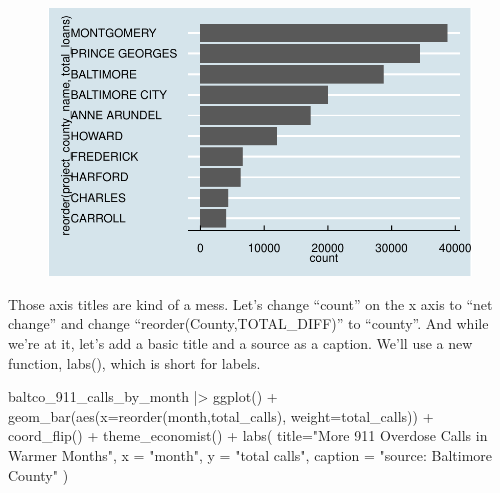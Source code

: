 \documentclass[
  letterpaper,
  DIV=11,
  numbers=noendperiod]{scrreprt}
\newenvironment{Shaded}{\begin{snugshade}}{\end{snugshade}}
\newcommand{\AttributeTok}[1]{\textcolor[rgb]{0.40,0.45,0.13}{#1}}
\newcommand{\FunctionTok}[1]{\textcolor[rgb]{0.28,0.35,0.67}{#1}}
\newcommand{\NormalTok}[1]{\textcolor[rgb]{0.00,0.23,0.31}{#1}}
\newcommand{\SpecialCharTok}[1]{\textcolor[rgb]{0.37,0.37,0.37}{#1}}
\newcommand{\StringTok}[1]{\textcolor[rgb]{0.13,0.47,0.30}{#1}}
\begin{document}
\begin{figure}[H]

{\centering \includegraphics{./visualizing-for-reporting_files/figure-pdf/unnamed-chunk-10-1.pdf}

}

\end{figure}

Those axis titles are kind of a mess. Let's change ``count'' on the x
axis to ``net change'' and change ``reorder(County,TOTAL\_DIFF)'' to
``county''. And while we're at it, let's add a basic title and a source
as a caption. We'll use a new function, labs(), which is short for
labels.

\begin{Shaded}
\begin{Highlighting}[]
\NormalTok{baltco\_911\_calls\_by\_month }\SpecialCharTok{|\textgreater{}}
  \FunctionTok{ggplot}\NormalTok{() }\SpecialCharTok{+}
  \FunctionTok{geom\_bar}\NormalTok{(}\FunctionTok{aes}\NormalTok{(}\AttributeTok{x=}\FunctionTok{reorder}\NormalTok{(month,total\_calls), }\AttributeTok{weight=}\NormalTok{total\_calls)) }\SpecialCharTok{+}
  \FunctionTok{coord\_flip}\NormalTok{() }\SpecialCharTok{+} 
  \FunctionTok{theme\_economist}\NormalTok{() }\SpecialCharTok{+}
  \FunctionTok{labs}\NormalTok{(}
    \AttributeTok{title=}\StringTok{"More 911 Overdose Calls in Warmer Months"}\NormalTok{,}
    \AttributeTok{x =} \StringTok{"month"}\NormalTok{,}
    \AttributeTok{y =} \StringTok{"total calls"}\NormalTok{,}
    \AttributeTok{caption =} \StringTok{"source: Baltimore County"}
\NormalTok{  )}
\end{Highlighting}
\end{Shaded}
\end{document}
